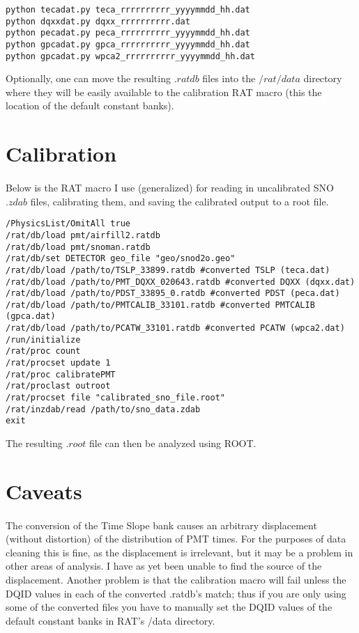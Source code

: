 \documentclass[12pt,letterpaper]{article}
\begin{document}
\begin{verbatim}
python tecadat.py teca_rrrrrrrrrr_yyyymmdd_hh.dat
python dqxxdat.py dqxx_rrrrrrrrrr.dat
python pecadat.py peca_rrrrrrrrrr_yyyymmdd_hh.dat
python gpcadat.py gpca_rrrrrrrrrr_yyyymmdd_hh.dat
python gpcadat.py wpca2_rrrrrrrrrr_yyyymmdd_hh.dat
\end{verbatim}

Optionally, one can move the resulting $.ratdb$ files into the $/rat/data$ directory where they will be easily available to the calibration RAT macro (this the location of the default constant banks).
\section{Calibration}
\paragraph{}Below is the RAT macro I use (generalized) for reading in uncalibrated SNO $.zdab$ files, calibrating them, and saving the calibrated output to a root file.
\begin{verbatim}
/PhysicsList/OmitAll true
/rat/db/load pmt/airfill2.ratdb
/rat/db/load pmt/snoman.ratdb
/rat/db/set DETECTOR geo_file "geo/snod2o.geo"
/rat/db/load /path/to/TSLP_33899.ratdb #converted TSLP (teca.dat)
/rat/db/load /path/to/PMT_DQXX_020643.ratdb #converted DQXX (dqxx.dat)
/rat/db/load /path/to/PDST_33895_0.ratdb #converted PDST (peca.dat)
/rat/db/load /path/to/PMTCALIB_33101.ratdb #converted PMTCALIB (gpca.dat)
/rat/db/load /path/to/PCATW_33101.ratdb #converted PCATW (wpca2.dat)
/run/initialize
/rat/proc count
/rat/procset update 1
/rat/proc calibratePMT
/rat/proclast outroot
/rat/procset file "calibrated_sno_file.root"
/rat/inzdab/read /path/to/sno_data.zdab
exit
\end{verbatim}
The resulting $.root$ file can then be analyzed using ROOT.
\section{Caveats}
\paragraph{}The conversion of the Time Slope bank causes an arbitrary displacement (without distortion) of the distribution of PMT times. For the purposes of data cleaning this is fine, as the displacement is irrelevant, but it may be a problem in other areas of analysis. I have as yet been unable to find the source of the displacement. Another problem is that the calibration macro will fail unless the DQID values in each of the converted .ratdb's match; thus if you are only using some of the converted files you have to manually set the DQID values of the default constant banks in RAT's /data directory.
\end{document}
